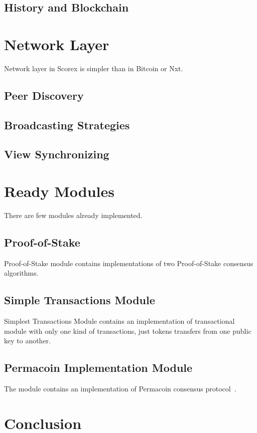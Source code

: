 \documentclass[]{report}   %
\begin{document}
\subsection{History and Blockchain}

\section{Network Layer}

Network layer in Scorex is simpler than in Bitcoin or Nxt. 

\subsection{Peer Discovery}

\subsection{Broadcasting Strategies}

\subsection{View Synchronizing}

\section{Ready Modules}
There are few modules already implemented.

\subsection{Proof-of-Stake}
Proof-of-Stake module contains implementations of two Proof-of-Stake consensus algorithms. 

\subsection{Simple Transactions Module}

Simplest Transactions Module contains an implementation of transactional module with only one kind of transactions, just tokens transfers from one public key to another.

\subsection{Permacoin Implementation Module}

The module contains an implementation of Permacoin consensus protocol~\cite{miller2014permacoin}.

\section{Conclusion}



\end{document}
